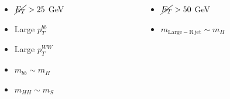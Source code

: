 \documentclass{beamer}
\newcommand*{\met}{\ensuremath{\cancel{E_{T}}}\xspace}
\newcommand*{\header}[1]{\fontsize{16}{8}\selectfont \textbf{{\color{MyPurple}{#1}}}}
\begin{document}
\begin{frame}
\begin{center}
\header{Signal Region}
\end{center}
\begin{columns}
\begin{column}{0.5\textwidth}
\begin{center}
\color{MyPurple}{Resolved}
\begin{itemize}
\item $\met{} > 25$ GeV
\item Large $p_T^{bb}$
\item Large $p_T^{WW}$
\item $m_{bb}\sim{}m_H$
\item $m_{HH}\sim{}m_{S}$
\end{itemize}
\end{center}
\end{column}
\begin{column}{0.5\textwidth}
\begin{center}
\vspace{-1.4cm}\color{MyPurple}{Boosted}
\end{center}
\begin{itemize}
\item $\met{} > 50$ GeV
\item $m_\mathrm{Large-R\ jet}\sim{}m_H$
\end{itemize}
\end{column}
\end{columns}
\end{frame}
\end{document}
